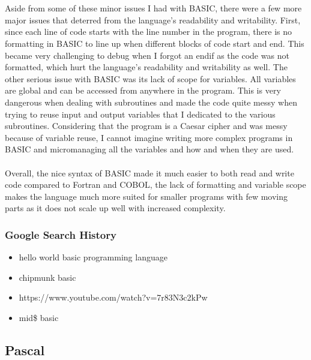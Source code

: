 \documentclass[letterpaper, 10pt, DIV=13]{scrartcl}
\numberwithin{equation}{section}
\numberwithin{figure}{section}
\numberwithin{table}{section}
\begin{document}
\\ \\
Aside from some of these minor issues I had with BASIC, there were a few more major issues that deterred from the language's readability and writability. First, since each line of code starts with the line number in the program, there is no formatting in BASIC to line up when different blocks of code start and end. This became very challenging to debug when I forgot an endif as the code was not formatted, which hurt the language's readability and writability as well. The other serious issue with BASIC was its lack of scope for variables. All variables are global and can be accessed from anywhere in the program. This is very dangerous when dealing with subroutines and made the code quite messy when trying to reuse input and output variables that I dedicated to the various subroutines. Considering that the program is a Caesar cipher and was messy because of variable reuse, I cannot imagine writing more complex programs in BASIC and micromanaging all the variables and how and when they are used.
\\ \\
Overall, the nice syntax of BASIC made it much easier to both read and write code compared to Fortran and COBOL, the lack of formatting and variable scope makes the language much more suited for smaller programs with few moving parts as it does not scale up well with increased complexity.

\subsubsection{Google Search History}
\begin{itemize}
	\item hello world basic programming language
	\item chipmunk basic
	\item https://www.youtube.com/watch?v=7r83N3c2kPw
	\item mid\$ basic 
\end{itemize}

\subsection{Pascal}
\end{document}
